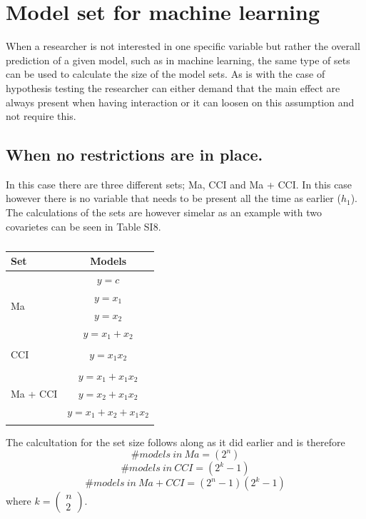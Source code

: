 \section{Model set for machine learning}
When a researcher is not interested in one specific variable but rather the overall prediction of a given model, such as in machine learning, the same type of sets can be used to calculate the size of the model sets. 
As is with the case of hypothesis testing the researcher can either demand that the main effect are always present when having interaction or it can loosen on this assumption and not require this. \\

\subsection{When no restrictions are in place.}
In this case there are three different sets; Ma, CCI and Ma + CCI. In this case however there is no variable that needs to be present all the time as earlier ($h_1$). The calculations of the sets are however simelar as an example with two covarietes can be seen in Table SI8.  

\begin{table}
\caption{}
\centering
\begin{tabular}{lc} 
\toprule
Set & Models \\ 
\midrule
\multirow{4}{*}{Ma} & $y=c$\\ & $y=x_1$\\ & $y=x_2$\\ & $y=x_1+x_2$\\ &  \\  
\multirow{1}{*}{CCI} & $y=x_1x_2$\\  & \\ 
\multirow{3}{*}{Ma + CCI}  & $y=x_1 + x_1x_2$\\ & $y=x_2 + x_1x_2$\\ & $y=x_1+x_2 + x_1x_2$\\ &  \\  
\bottomrule
\end{tabular}
\end{table}

The calcultation for the set size follows along as it did earlier and is therefore
\\
\[\#models\ in\ Ma=\left(2^n\right)\] 
\[\#models\ in\ CCI=\left(2^k-1\right)\] 
\[\#models\ in\ Ma+CCI=\left(2^n-1\right)\left(2^k-1\right)\] 
where $k=\left( \begin{array}{c}
n \\ 
2 \end{array}
\right)$. 

